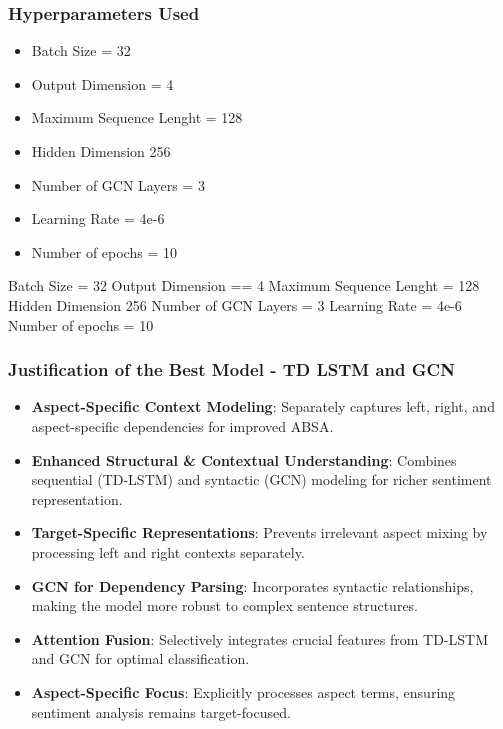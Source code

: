 \documentclass{article}
\begin{document}
\subsubsection{Hyperparameters Used}
\begin{itemize}
    \item Batch Size = 32
\item Output Dimension = 4
\item Maximum Sequence Lenght = 128
\item Hidden Dimension  256
\item Number of GCN Layers = 3
\item Learning Rate = 4e-6
\item Number of epochs = 10
\end{itemize}
Batch Size = 32
Output Dimension == 4
Maximum Sequence Lenght = 128
Hidden Dimension  256
Number of GCN Layers = 3
Learning Rate = 4e-6
Number of epochs = 10
\subsubsection{Justification of the Best Model - TD LSTM and GCN}
\begin{itemize}

    \item \textbf{Aspect-Specific Context Modeling}: Separately captures left, right, and aspect-specific dependencies for improved ABSA.

    \item \textbf{Enhanced Structural \& Contextual Understanding}: Combines sequential (TD-LSTM) and syntactic (GCN) modeling for richer sentiment representation.

    \item \textbf{Target-Specific Representations}: Prevents irrelevant aspect mixing by processing left and right contexts separately.

    \item \textbf{GCN for Dependency Parsing}: Incorporates syntactic relationships, making the model more robust to complex sentence structures.

    \item \textbf{Attention Fusion}: Selectively integrates crucial features from TD-LSTM and GCN for optimal classification.
    \item \textbf{Aspect-Specific Focus}: Explicitly processes aspect terms, ensuring sentiment analysis remains target-focused.

\end{itemize}
\end{document}
